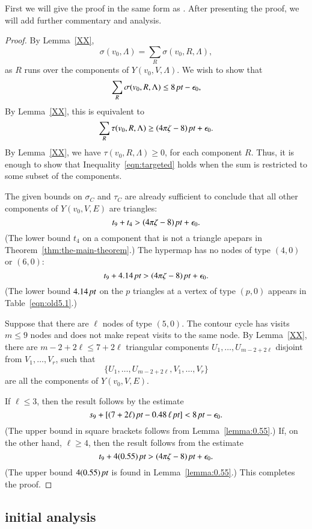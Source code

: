 First we will give the proof in the same form as \cite{DCG}.
After presenting the proof, we will add further commentary and analysis.


\begin{proof}  
By Lemma~\ref{XX},
  $$
  \sigma(v_0,\Lambda) = \sum_{R}\sigma(v_0,R,\Lambda),
  $$
as $R$ runs over the components of $Y(v_0,V,\Lambda)$.
We wish to show that
  $$
  \sum_{R}\sigma(v_0,R,\Lambda)\le 8\,\hbox{\it pt} -\epsilon_0,
  $$
By Lemma~\ref{XX}, this is equivalent to
  \begin{equation}
  \sum_{R} \tau(v_0,R,\Lambda)\ge (4\pi\zeta-8)\,\hbox{\it pt}+\epsilon_0.
  \label{eqn:targeted}
  \end{equation}
By Lemma~\ref{XX}, we have $\tau(v_0,R,\Lambda)\ge0$, for
each component $R$.  Thus, it is enough to show that
Inequality~\ref{eqn:targeted} holds when the sum is restricted
to some subset of the components.

The given bounds on $\sigma_C$ and $\tau_C$ are
already sufficient to conclude that all other components of
$Y(v_0,V,E)$ are triangles:
   $$
   t_9 + t_4 > (4\pi\zeta -8)\,\hbox{\it pt} + \epsilon_0.
   $$
(The lower bound $t_4$ on a component that is not a triangle apepars
in Theorem~\ref{thm:the-main-theorem}.)
The hypermap has no nodes of type $(4,0)$ or $(6,0)$:
$$
   t_9 + 4.14\,\hbox{\it pt} > (4\pi\zeta-8)\,\hbox{\it pt} + \epsilon_0.
$$
(The lower bound $4.14\,\hbox{\it pt}$ on the $p$ triangles at a vertex
of type $(p,0)$ appears in Table~\ref{eqn:old5.1}.)

Suppose that there are $\ell$ nodes of type $(5,0)$.  The
contour cycle has visits  $m\le 9$ nodes and does
not make repeat visits to the same node.  By Lemma~\ref{XX}, 
there are $m-2 + 2\ell\le 7+2\ell$ 
triangular components $U_1,\ldots,U_{m-2+2\ell}$
disjoint from $V_1,\ldots,V_r$, such that
   $$
   \{U_1,\ldots,U_{m-2+2\ell},V_1,\ldots,V_r\}
   $$
are all the components of $Y(v_0,V,E)$.

If $\ell\le 3$, then the result follows by the estimate
   $$
   s_9 + [(7+2\ell)\,\hbox{\it pt} - 0.48\,\ell\,\hbox{\it pt}] < 8\,\hbox{\it pt} - \epsilon_0.
   $$
(The upper bound in square brackets follows from Lemma~\ref{lemma:0.55}.)
If, on the other hand, $\ell\ge 4$, then the result follows from
the estimate
   $$
   t_9 + 4 (0.55)\,\hbox{\it pt} > (4\pi\zeta -8)\,\hbox{\it pt} + \epsilon_0.
   $$
(The upper bound $4(0.55)\,\hbox{\it pt}$ is found in Lemma~\ref{lemma:0.55}.)
This completes the proof.
\end{proof}

\subsection{initial analysis}

